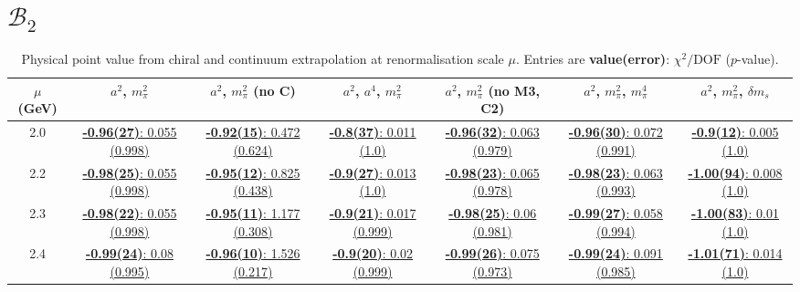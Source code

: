 \documentclass[12pt]{extarticle}
\begin{document}
\section{$\mathcal{B}_2$}
\begin{table}[h!]
\begin{center}
\begin{tabular}{|c|c|c|c|c|c|c|}
\hline
$\mu$ (GeV) & $a^2$, $m_\pi^2$& $a^2$, $m_\pi^2$ (no C)& $a^2$, $a^4$, $m_\pi^2$& $a^2$, $m_\pi^2$ (no M3, C2)& $a^2$, $m_\pi^2$, $m_\pi^4$& $a^2$, $m_\pi^2$, $\delta m_s$\\
\hline
2.0& \hyperlink{VVmAA/NPR/a2m2_20.pdf.1}{\textbf{-0.96(27)}: 0.055 (0.998)} & \hyperlink{VVmAA/NPR/a2m2noC_20.pdf.1}{\textbf{-0.92(15)}: 0.472 (0.624)} & \hyperlink{VVmAA/NPR/a2a4m2_20.pdf.1}{\textbf{-0.8(37)}: 0.011 (1.0)} & \hyperlink{VVmAA/NPR/a2m2mcut_20.pdf.1}{\textbf{-0.96(32)}: 0.063 (0.979)} & \hyperlink{VVmAA/NPR/a2m2m4_20.pdf.1}{\textbf{-0.96(30)}: 0.072 (0.991)} & \hyperlink{VVmAA/NPR/a2m2delm_20.pdf.1}{\textbf{-0.9(12)}: 0.005 (1.0)}\\
2.2& \hyperlink{VVmAA/NPR/a2m2_22.pdf.1}{\textbf{-0.98(25)}: 0.055 (0.998)} & \hyperlink{VVmAA/NPR/a2m2noC_22.pdf.1}{\textbf{-0.95(12)}: 0.825 (0.438)} & \hyperlink{VVmAA/NPR/a2a4m2_22.pdf.1}{\textbf{-0.9(27)}: 0.013 (1.0)} & \hyperlink{VVmAA/NPR/a2m2mcut_22.pdf.1}{\textbf{-0.98(23)}: 0.065 (0.978)} & \hyperlink{VVmAA/NPR/a2m2m4_22.pdf.1}{\textbf{-0.98(23)}: 0.063 (0.993)} & \hyperlink{VVmAA/NPR/a2m2delm_22.pdf.1}{\textbf{-1.00(94)}: 0.008 (1.0)}\\
2.3& \hyperlink{VVmAA/NPR/a2m2_23.pdf.1}{\textbf{-0.98(22)}: 0.055 (0.998)} & \hyperlink{VVmAA/NPR/a2m2noC_23.pdf.1}{\textbf{-0.95(11)}: 1.177 (0.308)} & \hyperlink{VVmAA/NPR/a2a4m2_23.pdf.1}{\textbf{-0.9(21)}: 0.017 (0.999)} & \hyperlink{VVmAA/NPR/a2m2mcut_23.pdf.1}{\textbf{-0.98(25)}: 0.06 (0.981)} & \hyperlink{VVmAA/NPR/a2m2m4_23.pdf.1}{\textbf{-0.99(27)}: 0.058 (0.994)} & \hyperlink{VVmAA/NPR/a2m2delm_23.pdf.1}{\textbf{-1.00(83)}: 0.01 (1.0)}\\
2.4& \hyperlink{VVmAA/NPR/a2m2_24.pdf.1}{\textbf{-0.99(24)}: 0.08 (0.995)} & \hyperlink{VVmAA/NPR/a2m2noC_24.pdf.1}{\textbf{-0.96(10)}: 1.526 (0.217)} & \hyperlink{VVmAA/NPR/a2a4m2_24.pdf.1}{\textbf{-0.9(20)}: 0.02 (0.999)} & \hyperlink{VVmAA/NPR/a2m2mcut_24.pdf.1}{\textbf{-0.99(26)}: 0.075 (0.973)} & \hyperlink{VVmAA/NPR/a2m2m4_24.pdf.1}{\textbf{-0.99(24)}: 0.091 (0.985)} & \hyperlink{VVmAA/NPR/a2m2delm_24.pdf.1}{\textbf{-1.01(71)}: 0.014 (1.0)}\\
\hline
\end{tabular}
\caption{Physical point value from chiral and continuum extrapolation at renormalisation scale $\mu$. Entries are \textbf{value(error)}: $\chi^2/\text{DOF}$ ($p$-value).}
\end{center}
\end{table}
\end{document}
